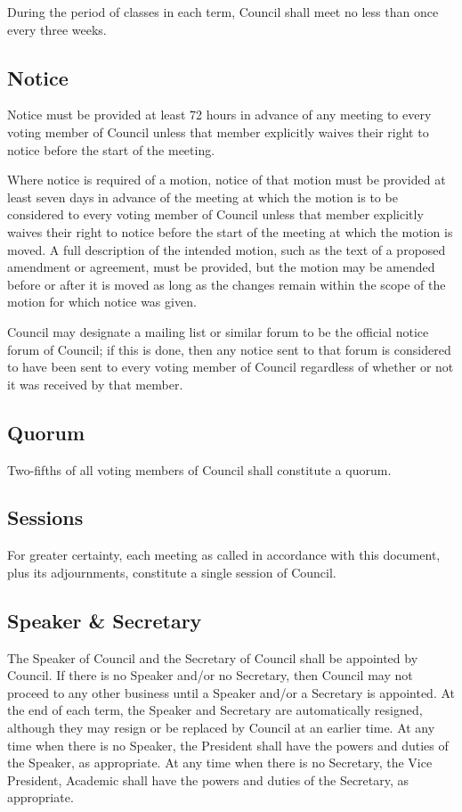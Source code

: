 During the period of classes in each term, Council shall meet no less than once
every three weeks.

\subsection{Notice}
Notice must be provided at least 72 hours in advance of any meeting to every
voting member of Council unless that member explicitly waives their right to
notice before the start of the meeting.

Where notice is required of a motion, notice of that motion must be provided at
least seven days in advance of the meeting at which the motion is to be
considered to every voting member of Council unless that member explicitly
waives their right to notice before the start of the meeting at which the motion
is moved. A full description of the intended motion, such as the text of a
proposed amendment or agreement, must be provided, but the motion may be
amended before or after it is moved as long as the changes remain within the
scope of the motion for which notice was given.

Council may designate a mailing list or similar forum to be the official notice
forum of Council; if this is done, then any notice sent to that forum is
considered to have been sent to every voting member of Council regardless of
whether or not it was received by that member.

\subsection{Quorum}
Two-fifths of all voting members of Council shall constitute a quorum.

\subsection{Sessions}
For greater certainty, each meeting as called in accordance with this document,
plus its adjournments, constitute a single session of Council.

\subsection{Speaker \& Secretary}
The Speaker of Council and the Secretary of Council shall be appointed by
Council. If there is no Speaker and/or no Secretary, then Council may not proceed to
any other business until a Speaker and/or a Secretary is appointed.  At the end of
each term, the Speaker and Secretary are automatically resigned, although they
may resign or be replaced by Council at an earlier time. At any time when there
is no Speaker, the President shall have the powers and duties of the Speaker, 
as appropriate.  At any time when there is no Secretary, the Vice President, Academic shall 
have the powers and duties of the Secretary, as appropriate.

